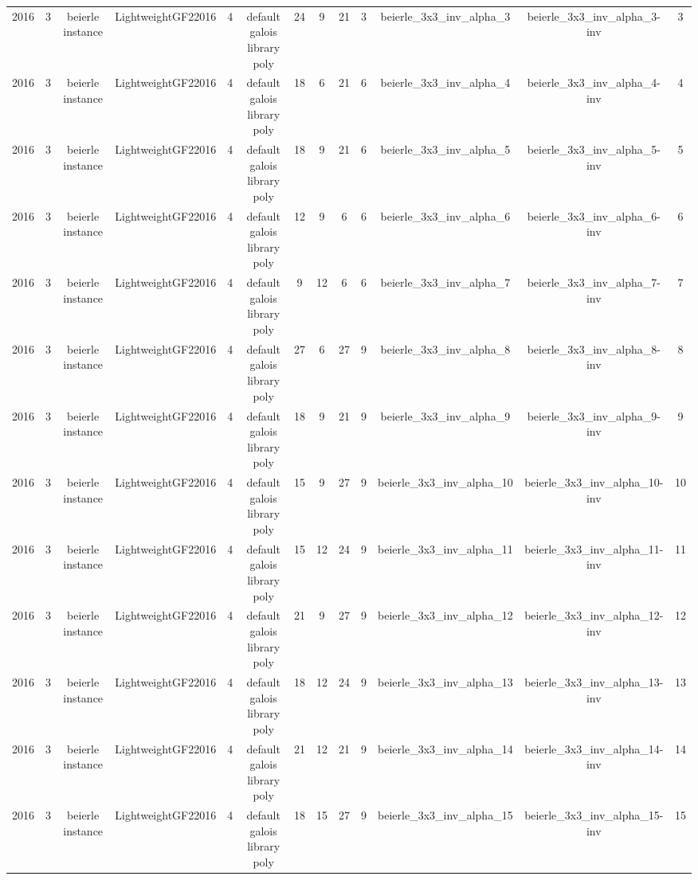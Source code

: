 \begin{tabular}{c c c c c c c c c c c c c}
2016 & 3 & beierle instance & LightweightGF22016 & 4 & default galois library poly & 24 & 9 & 21 & 3 & beierle_3x3_inv_alpha_3 & beierle_3x3_inv_alpha_3-inv & 3 \\
2016 & 3 & beierle instance & LightweightGF22016 & 4 & default galois library poly & 18 & 6 & 21 & 6 & beierle_3x3_inv_alpha_4 & beierle_3x3_inv_alpha_4-inv & 4 \\
2016 & 3 & beierle instance & LightweightGF22016 & 4 & default galois library poly & 18 & 9 & 21 & 6 & beierle_3x3_inv_alpha_5 & beierle_3x3_inv_alpha_5-inv & 5 \\
2016 & 3 & beierle instance & LightweightGF22016 & 4 & default galois library poly & 12 & 9 & 6 & 6 & beierle_3x3_inv_alpha_6 & beierle_3x3_inv_alpha_6-inv & 6 \\
2016 & 3 & beierle instance & LightweightGF22016 & 4 & default galois library poly & 9 & 12 & 6 & 6 & beierle_3x3_inv_alpha_7 & beierle_3x3_inv_alpha_7-inv & 7 \\
2016 & 3 & beierle instance & LightweightGF22016 & 4 & default galois library poly & 27 & 6 & 27 & 9 & beierle_3x3_inv_alpha_8 & beierle_3x3_inv_alpha_8-inv & 8 \\
2016 & 3 & beierle instance & LightweightGF22016 & 4 & default galois library poly & 18 & 9 & 21 & 9 & beierle_3x3_inv_alpha_9 & beierle_3x3_inv_alpha_9-inv & 9 \\
2016 & 3 & beierle instance & LightweightGF22016 & 4 & default galois library poly & 15 & 9 & 27 & 9 & beierle_3x3_inv_alpha_10 & beierle_3x3_inv_alpha_10-inv & 10 \\
2016 & 3 & beierle instance & LightweightGF22016 & 4 & default galois library poly & 15 & 12 & 24 & 9 & beierle_3x3_inv_alpha_11 & beierle_3x3_inv_alpha_11-inv & 11 \\
2016 & 3 & beierle instance & LightweightGF22016 & 4 & default galois library poly & 21 & 9 & 27 & 9 & beierle_3x3_inv_alpha_12 & beierle_3x3_inv_alpha_12-inv & 12 \\
2016 & 3 & beierle instance & LightweightGF22016 & 4 & default galois library poly & 18 & 12 & 24 & 9 & beierle_3x3_inv_alpha_13 & beierle_3x3_inv_alpha_13-inv & 13 \\
2016 & 3 & beierle instance & LightweightGF22016 & 4 & default galois library poly & 21 & 12 & 21 & 9 & beierle_3x3_inv_alpha_14 & beierle_3x3_inv_alpha_14-inv & 14 \\
2016 & 3 & beierle instance & LightweightGF22016 & 4 & default galois library poly & 18 & 15 & 27 & 9 & beierle_3x3_inv_alpha_15 & beierle_3x3_inv_alpha_15-inv & 15 \\

\end{tabular}
